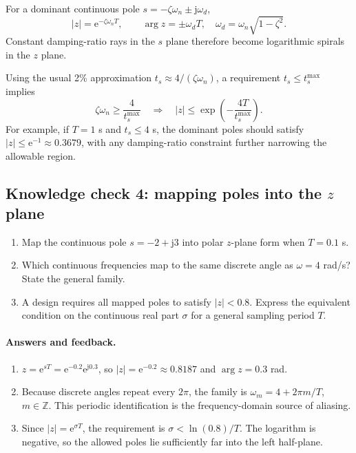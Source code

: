 \documentclass[11pt]{article}
\newcommand{\e}{\mathrm{e}}
\begin{document}
For a dominant continuous pole $s=-\zeta\omega_n\pm\mathrm{j}\omega_d$,
\[
|z|=\e^{-\zeta\omega_nT},\qquad
\arg z=\pm\omega_dT,
\quad \omega_d=\omega_n\sqrt{1-\zeta^2}.
\]
Constant damping-ratio rays in the $s$ plane therefore become logarithmic spirals in the $z$ plane.

Using the usual 2\% approximation $t_s\approx4/(\zeta\omega_n)$, a requirement $t_s\le t_s^{\max}$ implies
\[
\zeta\omega_n\ge\frac{4}{t_s^{\max}}
\quad\Longrightarrow\quad
|z|\le \exp\left(-\frac{4T}{t_s^{\max}}\right).
\]
For example, if $T=1$ s and $t_s\le4$ s, the dominant poles should satisfy $|z|\le\e^{-1}\approx0.3679$, with any damping-ratio constraint further narrowing the allowable region.

\subsection*{Knowledge check 4: mapping poles into the $z$ plane}

\begin{enumerate}[label=\textbf{Q\arabic*.},wide]
  \item Map the continuous pole $s=-2+\mathrm{j}3$ into polar $z$-plane form when $T=0.1$ s.
  \item Which continuous frequencies map to the same discrete angle as $\omega=4$ rad/s? State the general family.
  \item A design requires all mapped poles to satisfy $|z|<0.8$. Express the equivalent condition on the continuous real part $\sigma$ for a general sampling period $T$.
\end{enumerate}

\paragraph{Answers and feedback.}
\begin{enumerate}[label=\textbf{A\arabic*.},wide]
  \item $z=\e^{sT}=\e^{-0.2}\e^{\mathrm{j}0.3}$, so $|z|=\e^{-0.2}\approx0.8187$ and $\arg z=0.3$ rad.
  \item Because discrete angles repeat every $2\pi$, the family is $\omega_m=4+2\pi m/T$, $m\in\mathbb{Z}$. This periodic identification is the frequency-domain source of aliasing.
  \item Since $|z|=\e^{\sigma T}$, the requirement is $\sigma<\ln(0.8)/T$. The logarithm is negative, so the allowed poles lie sufficiently far into the left half-plane.
\end{enumerate}
\end{document}
